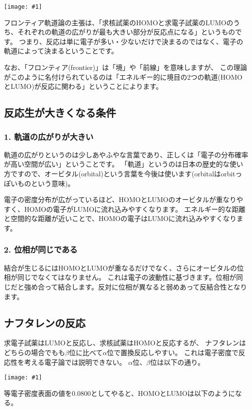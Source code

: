 \documentclass[a4paper,papersize,dvipdfmx]{jsarticle}
\newcommand{\pict}[2]{\begin{center} \texttt{[image: \#1]} \end{center}}   %
\begin{document}
\pict{image/00.png}{8}

フロンティア軌道論の主張は、「求核試薬のHOMOと求電子試薬のLUMOのうち、それぞれの軌道の広がりが最も大きい部分が反応点になる」というものです。
つまり、反応は単に電子が多い・少ないだけで決まるのではなく、電子の軌道によって決まるということです。

なお、「フロンティア(frontier)」は「境」や「前線」を意味しますが、
この理論がこのように名付けられているのは「エネルギー的に境目の2つの軌道(HOMOとLUMO)が反応に関わる」ということによります。

\subsection{反応生が大きくなる条件}

\subsubsection{1. 軌道の広がりが大きい}
軌道の広がりというのは少しあやふやな言葉であり、正しくは「電子の分布確率が高い空間が広い」ということです。
「軌道」というのは日本の歴史的な使い方ですので、オービタル(orbital)という言葉を今後は使います(orbitalはorbitっぽいものという意味)。

電子の密度分布が広がっているほど、HOMOとLUMOのオービタルが重なりやすく、HOMOの電子がLUMOに流れ込みやすくなります。
エネルギー的な距離と空間的な距離が近いことで、HOMOの電子はLUMOに流れ込みやすくなります。

\subsubsection{2. 位相が同じである}
結合が生じるにはHOMOとLUMOが重なるだけでなく、さらにオービタルの位相が同じでなくてはなりません。
これは電子の波動性に基づきます。位相が同じだと強め合って結合します。反対に位相が異なると弱めあって反結合性となります。

\subsection{ナフタレンの反応}

求電子試薬はLUMOと反応し、求核試薬はHOMOと反応するが、
ナフタレンはどちらの場合でもも$\beta$位に比べて$\alpha$位で置換反応しやすい。
これは電子密度で反応性を考える電子論では説明できない。
$\alpha$位、$\beta$位は以下の通り。

\pict{image/01.png}{5}

等電子密度表面の値を0.0800としてやると、HOMOとLUMOは以下のようになる。
\end{document}
